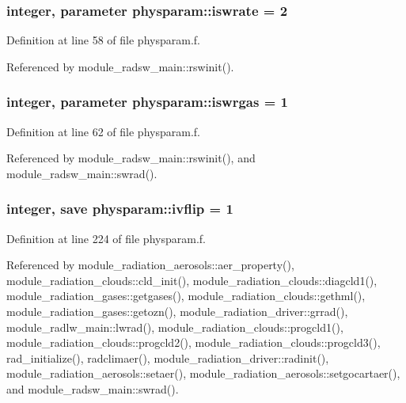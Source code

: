\subsubsection[{\texorpdfstring{iswrate}{iswrate}}]{\setlength{\rightskip}{0pt plus 5cm}integer, parameter physparam\+::iswrate = 2}\hypertarget{namespacephysparam_a20514cb92f09ee6e32f2f1def570ace1}{}\label{namespacephysparam_a20514cb92f09ee6e32f2f1def570ace1}


Definition at line 58 of file physparam.\+f.



Referenced by module\+\_\+radsw\+\_\+main\+::rswinit().

\subsubsection[{\texorpdfstring{iswrgas}{iswrgas}}]{\setlength{\rightskip}{0pt plus 5cm}integer, parameter physparam\+::iswrgas = 1}\hypertarget{namespacephysparam_a8782cc8df3a1d906c2ddb3d900468568}{}\label{namespacephysparam_a8782cc8df3a1d906c2ddb3d900468568}


Definition at line 62 of file physparam.\+f.



Referenced by module\+\_\+radsw\+\_\+main\+::rswinit(), and module\+\_\+radsw\+\_\+main\+::swrad().

\subsubsection[{\texorpdfstring{ivflip}{ivflip}}]{\setlength{\rightskip}{0pt plus 5cm}integer, save physparam\+::ivflip = 1}\hypertarget{namespacephysparam_a7318a941744b1ec62dc9a6ff5bfbb50d}{}\label{namespacephysparam_a7318a941744b1ec62dc9a6ff5bfbb50d}


Definition at line 224 of file physparam.\+f.



Referenced by module\+\_\+radiation\+\_\+aerosols\+::aer\+\_\+property(), module\+\_\+radiation\+\_\+clouds\+::cld\+\_\+init(), module\+\_\+radiation\+\_\+clouds\+::diagcld1(), module\+\_\+radiation\+\_\+gases\+::getgases(), module\+\_\+radiation\+\_\+clouds\+::gethml(), module\+\_\+radiation\+\_\+gases\+::getozn(), module\+\_\+radiation\+\_\+driver\+::grrad(), module\+\_\+radlw\+\_\+main\+::lwrad(), module\+\_\+radiation\+\_\+clouds\+::progcld1(), module\+\_\+radiation\+\_\+clouds\+::progcld2(), module\+\_\+radiation\+\_\+clouds\+::progcld3(), rad\+\_\+initialize(), radclimaer(), module\+\_\+radiation\+\_\+driver\+::radinit(), module\+\_\+radiation\+\_\+aerosols\+::setaer(), module\+\_\+radiation\+\_\+aerosols\+::setgocartaer(), and module\+\_\+radsw\+\_\+main\+::swrad().

